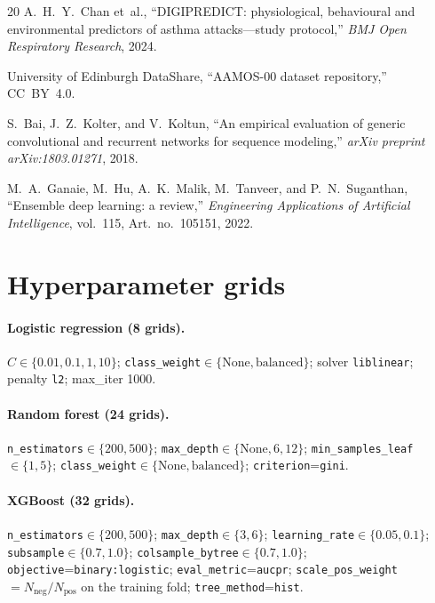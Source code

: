 \documentclass[11pt,a4paper]{article}
\begin{document}
\begin{thebibliography}{20}
A.~H.~Y.~Chan et~al., ``DIGIPREDICT: physiological, behavioural and
environmental predictors of asthma attacks---study protocol,''
\emph{BMJ Open Respiratory Research}, 2024.

University of Edinburgh DataShare, ``AAMOS-00 dataset repository,''
CC~BY~4.0.

S.~Bai, J.~Z.~Kolter, and V.~Koltun, ``An empirical evaluation of
generic convolutional and recurrent networks for sequence modeling,''
\emph{arXiv preprint arXiv:1803.01271}, 2018.

M.~A.~Ganaie, M.~Hu, A.~K.~Malik, M.~Tanveer, and P.~N.~Suganthan,
``Ensemble deep learning: a review,'' \emph{Engineering Applications
of Artificial Intelligence}, vol.~115, Art.~no.~105151, 2022.

\end{thebibliography}

\appendix
\section{Hyperparameter grids}\label{app:grids}

\paragraph{Logistic regression (8 grids).}
$C\in\{0.01,0.1,1,10\}$;
\texttt{class\_weight}$\in\{\text{None},\text{balanced}\}$;
solver \texttt{liblinear}; penalty \texttt{l2}; max\_iter 1000.

\paragraph{Random forest (24 grids).}
\texttt{n\_estimators}$\in\{200,500\}$;
\texttt{max\_depth}$\in\{\text{None},6,12\}$;
\texttt{min\_samples\_leaf}$\in\{1,5\}$;
\texttt{class\_weight}$\in\{\text{None},\text{balanced}\}$;
\texttt{criterion}=\texttt{gini}.

\paragraph{XGBoost (32 grids).}
\texttt{n\_estimators}$\in\{200,500\}$;
\texttt{max\_depth}$\in\{3,6\}$;
\texttt{learning\_rate}$\in\{0.05,0.1\}$;
\texttt{subsample}$\in\{0.7,1.0\}$;
\texttt{colsample\_bytree}$\in\{0.7,1.0\}$;
\texttt{objective}=\texttt{binary:logistic};
\texttt{eval\_metric}=\texttt{aucpr};
\texttt{scale\_pos\_weight} $=N_{\text{neg}}/N_{\text{pos}}$ on the
training fold; \texttt{tree\_method}=\texttt{hist}.
\end{document}
